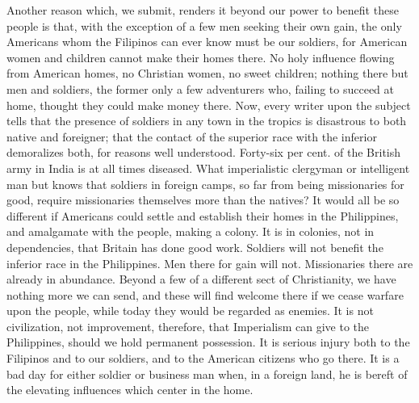 \documentclass[11pt,openany]{book}
\begin{document}
Another reason which, we submit, renders it beyond our power to benefit these people is that, with the exception of a few men seeking their own gain, the only Americans whom the Filipinos can ever know must be our soldiers, for American women and children cannot make their homes there. No holy influence flowing from American homes, no Christian women, no sweet children; nothing there but men and soldiers, the former only a few adventurers who, failing to succeed at home, thought they could make money there. Now, every writer upon the subject tells that the presence of soldiers in any town in the tropics is disastrous to both native and foreigner; that the contact of the superior race with the inferior demoralizes both, for reasons well understood. Forty-six per cent. of the British army in India is at all times diseased. What imperialistic clergyman or intelligent man but knows that soldiers in foreign camps, so far from being missionaries for good, require missionaries themselves more than the natives? It would all be so different if Americans could settle and establish their homes in the Philippines, and amalgamate with the people, making a colony. It is in colonies, not in dependencies, that Britain has done good work. Soldiers will not benefit the inferior race in the Philippines. Men there for gain will not. Missionaries there are already in abundance. Beyond a few of a different sect of Christianity, we have nothing more we can send, and these will find welcome there if we cease warfare upon the people, while today they would be regarded as enemies. It is not civilization, not improvement, therefore, that Imperialism can give to the Philippines, should we hold permanent possession. It is serious injury both to the Filipinos and to our soldiers, and to the American citizens who go there. It is a bad day for either soldier or business man when, in a foreign land, he is bereft of the elevating influences which center in the home.
\end{document}
